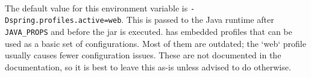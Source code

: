 
\noindent\\The default value for this environment variable is 
\texttt{-Dspring.profiles.active=web}.  This is passed to the Java runtime after 
\texttt{JAVA\_PROPS} and before the \cxflow jar is executed.  \cxflow has embedded profiles that 
can be used as a basic set of configurations.  Most of them are outdated; the `web` profile
usually causes fewer configuration issues.  These are not documented in the \cxflow documentation, 
so it is best to leave this as-is unless advised to do otherwise.
